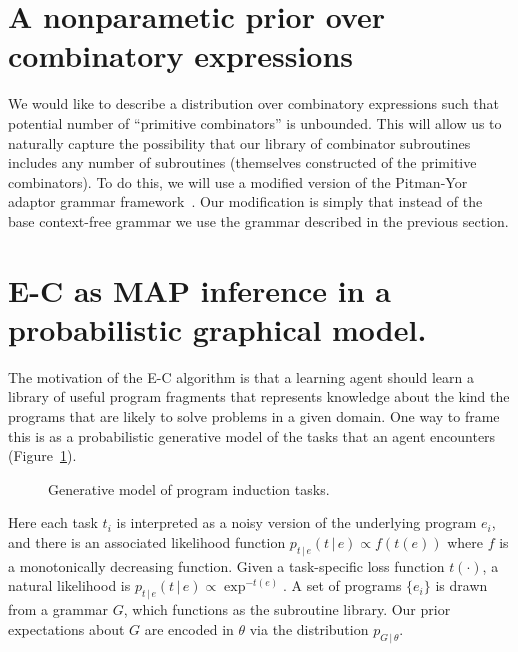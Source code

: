 \documentclass{article}
\renewcommand{\given}{\, | \,}
\begin{document}
\section{A nonparametic prior over combinatory expressions}
We would like to describe a distribution over combinatory expressions
such that potential number of ``primitive combinators'' is
unbounded. This will allow us to naturally capture the possibility
that our library of combinator subroutines includes any number of
subroutines (themselves constructed of the primitive combinators). To
do this, we will use a modified version of the Pitman-Yor adaptor
grammar framework~\cite{DBLP:conf/nips/JohnsonGG06}. Our modification
is simply that instead of the base context-free grammar we use the
grammar described in the previous section. 

\section{E-C as MAP inference in a probabilistic graphical model.}
The motivation of the E-C algorithm is that a learning agent should
learn a library of useful program fragments that represents knowledge
about the kind the programs that are likely to solve problems in a
given domain. One way to frame this is as a probabilistic generative
model of the tasks that an agent encounters
(Figure~\ref{fig:generativeModel}).

\begin{figure}
\caption{Generative model of program induction
  tasks. \label{fig:generativeModel}}
\end{figure}

Here each task $t_i$ is interpreted as a noisy version of the
underlying program $e_i$, and there is an associated likelihood
function $p_{t\given e}(t \given e) \propto f(t(e)) $ where $f$ is a monotonically
decreasing function. Given a task-specific loss function $t(\cdot)$, a
natural likelihood is $p_{t \given e}(t \given e) \propto \exp^{-t(e)}$. A set of
programs $\{e_i\}$ is drawn from a grammar $G$, which functions as the
subroutine library. Our prior expectations about $G$ are encoded in
$\theta$ via the distribution $p_{G \given \theta}$. 
\end{document}

